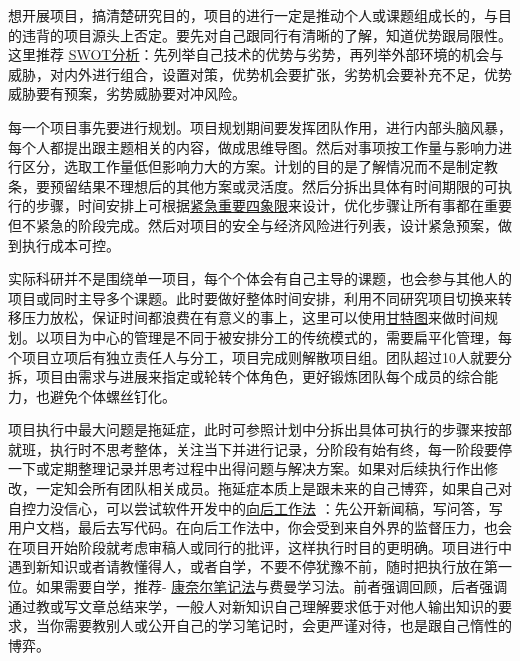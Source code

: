 \documentclass[]{tufte-book}
\begin{document}
想开展项目，搞清楚研究目的，项目的进行一定是推动个人或课题组成长的，与目的违背的项目源头上否定。要先对自己跟同行有清晰的了解，知道优势跟局限性。这里推荐 \href{https://zh.wikipedia.org/wiki/\%E5\%BC\%B7\%E5\%BC\%B1\%E5\%8D\%B1\%E6\%A9\%9F\%E5\%88\%86\%E6\%9E\%90}{SWOT分析}：先列举自己技术的优势与劣势，再列举外部环境的机会与威胁，对内外进行组合，设置对策，优势机会要扩张，劣势机会要补充不足，优势威胁要有预案，劣势威胁要对冲风险。

每一个项目事先要进行规划。项目规划期间要发挥团队作用，进行内部头脑风暴，每个人都提出跟主题相关的内容，做成思维导图。然后对事项按工作量与影响力进行区分，选取工作量低但影响力大的方案。计划的目的是了解情况而不是制定教条，要预留结果不理想后的其他方案或灵活度。然后分拆出具体有时间期限的可执行的步骤，时间安排上可根据\href{https://wiki.mbalib.com/wiki/\%E6\%97\%B6\%E9\%97\%B4\%E2\%80\%9C\%E5\%9B\%9B\%E8\%B1\%A1\%E9\%99\%90\%E2\%80\%9D\%E6\%B3\%95}{紧急重要四象限}来设计，优化步骤让所有事都在重要但不紧急的阶段完成。然后对项目的安全与经济风险进行列表，设计紧急预案，做到执行成本可控。

实际科研并不是围绕单一项目，每个个体会有自己主导的课题，也会参与其他人的项目或同时主导多个课题。此时要做好整体时间安排，利用不同研究项目切换来转移压力放松，保证时间都浪费在有意义的事上，这里可以使用\href{https://zh.wikipedia.org/wiki/\%E7\%94\%98\%E7\%89\%B9\%E5\%9B\%BE}{甘特图}来做时间规划。以项目为中心的管理是不同于被安排分工的传统模式的，需要扁平化管理，每个项目立项后有独立责任人与分工，项目完成则解散项目组。团队超过10人就要分拆，项目由需求与进展来指定或轮转个体角色，更好锻炼团队每个成员的综合能力，也避免个体螺丝钉化。

项目执行中最大问题是拖延症，此时可参照计划中分拆出具体可执行的步骤来按部就班，执行时不思考整体，关注当下并进行记录，分阶段有始有终，每一阶段要停一下或定期整理记录并思考过程中出得问题与解决方案。如果对后续执行作出修改，一定知会所有团队相关成员。拖延症本质上是跟未来的自己博弈，如果自己对自控力没信心，可以尝试软件开发中的\href{https://www.allthingsdistributed.com/2006/11/working_backwards.html}{向后工作法} ：先公开新闻稿，写问答，写用户文档，最后去写代码。在向后工作法中，你会受到来自外界的监督压力，也会在项目开始阶段就考虑审稿人或同行的批评，这样执行时目的更明确。项目进行中遇到新知识或者请教懂得人，或者自学，不要不停犹豫不前，随时把执行放在第一位。如果需要自学，推荐- \href{https://zh.wikipedia.org/wiki/\%E5\%BA\%B7\%E5\%A5\%88\%E5\%B0\%94\%E7\%AC\%94\%E8\%AE\%B0\%E6\%B3\%95}{康奈尔笔记法}与费曼学习法。前者强调回顾，后者强调通过教或写文章总结来学，一般人对新知识自己理解要求低于对他人输出知识的要求，当你需要教别人或公开自己的学习笔记时，会更严谨对待，也是跟自己惰性的博弈。
\end{document}

